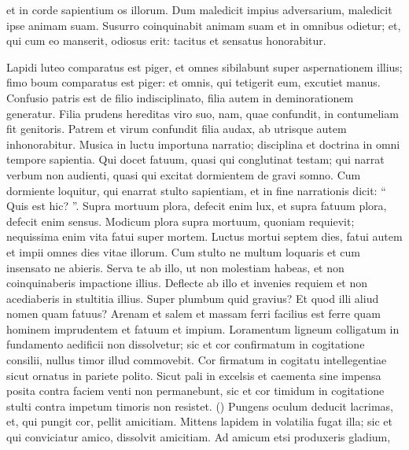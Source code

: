 \begin{biblechapter}
\begin{biblechapter}
\begin{biblechapter}
\begin{biblechapter}
\begin{biblechapter}
\begin{biblechapter}
\begin{biblechapter}
\begin{biblechapter}
\begin{biblechapter}
\begin{biblechapter}
\begin{biblechapter}
\begin{biblechapter}
\begin{biblechapter}
\begin{biblechapter}
\begin{biblechapter}
\begin{biblechapter}
\begin{biblechapter}
\begin{biblechapter}
\begin{biblechapter}
\begin{biblechapter}
\begin{biblechapter}
 et in corde sapientium os illorum.
 \verse Dum maledicit impius adversarium,
 maledicit ipse animam suam.
 \verse Susurro coinquinabit animam suam et in omnibus odietur;
 et, qui cum eo manserit, odiosus erit:
 tacitus et sensatus honorabitur.
 
\begin{biblechapter}
\verse Lapidi luteo comparatus est piger,
 et omnes sibilabunt super aspernationem illius;
 \verse fimo boum comparatus est piger:
 et omnis, qui tetigerit eum, excutiet manus.
 \verse Confusio patris est de filio indisciplinato,
 filia autem in deminorationem generatur.
 \verse Filia prudens hereditas viro suo,
 nam, quae confundit, in contumeliam fit genitoris.
 \verse Patrem et virum confundit filia audax,
 ab utrisque autem inhonorabitur.
 \verse Musica in luctu importuna narratio;
 disciplina et doctrina in omni tempore sapientia.
 \verse Qui docet fatuum, quasi qui conglutinat testam;
 \verse qui narrat verbum non audienti,
 quasi qui excitat dormientem de gravi somno.
 \verse Cum dormiente loquitur, qui enarrat stulto sapientiam,
 et in fine narrationis dicit: “ Quis est hic? ”.
 \verse Supra mortuum plora, defecit enim lux,
 et supra fatuum plora, defecit enim sensus.
 \verse Modicum plora supra mortuum, quoniam requievit;
 \verse nequissima enim vita fatui super mortem.
 \verse Luctus mortui septem dies,
 fatui autem et impii omnes dies vitae illorum.
 \verse Cum stulto ne multum loquaris
 et cum insensato ne abieris.
 \verse Serva te ab illo, ut non molestiam habeas,
 et non coinquinaberis impactione illius.
 \verse Deflecte ab illo et invenies requiem
 et non acediaberis in stultitia illius.
 \verse Super plumbum quid gravius?
 Et quod illi aliud nomen quam fatuus?
 \verse Arenam et salem et massam ferri facilius est ferre
 quam hominem imprudentem et fatuum et impium.
 \verse Loramentum ligneum colligatum in fundamento aedificii
 non dissolvetur;
 sic et cor confirmatum in cogitatione consilii,
 nullus timor illud commovebit.
 \verse Cor firmatum in cogitatu intellegentiae
 sicut ornatus in pariete polito.
 \verse Sicut pali in excelsis et caementa sine impensa posita
 contra faciem venti non permanebunt,
 \verse sic et cor timidum in cogitatione stulti
 contra impetum timoris non resistet. (\verse)
 \verse Pungens oculum deducit lacrimas,
 et, qui pungit cor, pellit amicitiam.
 \verse Mittens lapidem in volatilia fugat illa;
 sic et qui conviciatur amico, dissolvit amicitiam.
 \verse Ad amicum etsi produxeris gladium,

\end{biblechapter}
\end{biblechapter}
\end{biblechapter}
\end{biblechapter}
\end{biblechapter}
\end{biblechapter}
\end{biblechapter}
\end{biblechapter}
\end{biblechapter}
\end{biblechapter}
\end{biblechapter}
\end{biblechapter}
\end{biblechapter}
\end{biblechapter}
\end{biblechapter}
\end{biblechapter}
\end{biblechapter}
\end{biblechapter}
\end{biblechapter}
\end{biblechapter}
\end{biblechapter}
\end{biblechapter}
